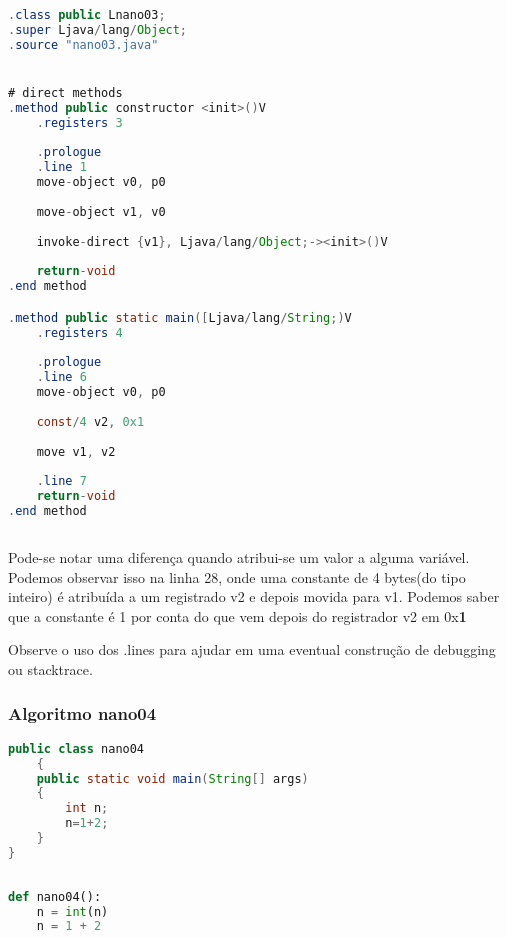 \documentclass[hidelinks,12pt]{article}
\begin{document}
	\begin{lstlisting}[caption=Smali resultante do .java,language=java]
.class public Lnano03;
.super Ljava/lang/Object;
.source "nano03.java"


# direct methods
.method public constructor <init>()V
	.registers 3
	
	.prologue
	.line 1
	move-object v0, p0
	
	move-object v1, v0
	
	invoke-direct {v1}, Ljava/lang/Object;-><init>()V
	
	return-void
.end method

.method public static main([Ljava/lang/String;)V
	.registers 4
	
	.prologue
	.line 6
	move-object v0, p0
	
	const/4 v2, 0x1
	
	move v1, v2
	
	.line 7
	return-void
.end method	
	
	\end{lstlisting}

Pode-se notar uma diferença quando atribui-se um valor a alguma variável. Podemos observar isso na linha 28, onde uma constante de 4 bytes(do tipo inteiro) é atribuída a um registrado v2 e depois movida para v1. Podemos saber que a constante é 1 por conta do que vem depois do registrador v2 em 0x\textbf{1}

Observe o uso dos .lines para ajudar em uma eventual construção de debugging ou stacktrace.\\
	
	
	\subsubsection{Algoritmo nano04}
	
	\begin{lstlisting}[caption=Código em Java,language=java]
public class nano04
	{
	public static void main(String[] args)
	{
		int n;
		n=1+2;
	}
}	
	
	\end{lstlisting}
	
	\begin{lstlisting}[caption=Código em python,language=Python]
def nano04():
	n = int(n)
	n = 1 + 2 	
	
	\end{lstlisting}
	
\end{document}
